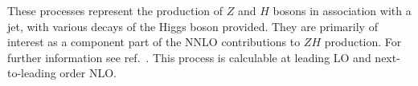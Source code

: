 These processes represent the production of $Z$ and $H$ bosons in
association with a jet, with various decays of the Higgs boson provided.
They are primarily of interest as a component
part of the NNLO contributions to $ZH$ production.
For further information see ref.~\cite{Campbell:2016jau}.
This process is calculable at leading LO and next-to-leading order NLO.
